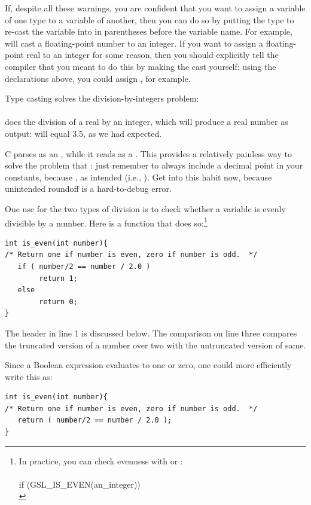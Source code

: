 If, despite all these warnings, you are confident that you want to
assign a variable of one type to a variable of another, then you can
do so by putting the type to re-cast the variable into in parentheses
before the variable name. For example,  will
cast a floating-point number to an integer.  If you want to assign
a floating-point real to an integer for some reason, then you should
explicitly tell the compiler that you meant to do this by making the cast
yourself: using the declarations above, you could assign , for example.

Type casting solves the division-by-integers problem: \\
\\
does the division of a real by an integer, which will produce a real
number as output:  will equal 3.5, as we had expected.

C parses  as an , while it reads 
as a . This provides a relatively painless way to solve
the problem that : just remember to always include
a decimal point in your constants, because ,
as intended (i.e., ). Get into this
habit now, because unintended roundoff is a hard-to-debug error.

One use for the two types of division is to check whether a variable is evenly divisible by a number. Here
is a function that does so:\footnote{In practice, you can check evenness
with  or :\\ 
\\
if (GSL\_IS\_EVEN(an\_integer))\\
\phantom{hello.}
}

\lstset{numbers=left, numberstyle=\scshape}\label{isevenfn}
\begin{lstlisting}
int is_even(int number){
/* Return one if number is even, zero if number is odd.  */
   if ( number/2 == number / 2.0 )
        return 1;
   else 
        return 0;
}
\end{lstlisting}
The header in line 1 is discussed below. The comparison on line three
compares the truncated version of a number over two with the untruncated
version of same.

Since a Boolean expression evaluates to one or zero,
one could more efficiently write this as:
\begin{lstlisting}
int is_even(int number){
/* Return one if number is even, zero if number is odd.  */
   return ( number/2 == number / 2.0 );
}
\end{lstlisting}


